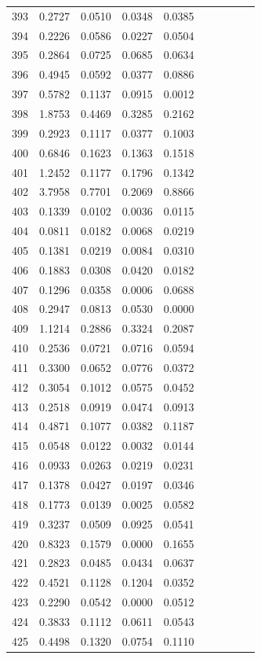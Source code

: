 \begin{table}
\begin{tabular}{cccccccccc}
393& 0.2727& 0.0510& 0.0348& 0.0385\\ 
394& 0.2226& 0.0586& 0.0227& 0.0504\\ 
395& 0.2864& 0.0725& 0.0685& 0.0634\\ 
396& 0.4945& 0.0592& 0.0377& 0.0886\\ 
397& 0.5782& 0.1137& 0.0915& 0.0012\\ 
398& 1.8753& 0.4469& 0.3285& 0.2162\\ 
399& 0.2923& 0.1117& 0.0377& 0.1003\\ 
400& 0.6846& 0.1623& 0.1363& 0.1518\\ 
401& 1.2452& 0.1177& 0.1796& 0.1342\\ 
402& 3.7958& 0.7701& 0.2069& 0.8866\\ 
403& 0.1339& 0.0102& 0.0036& 0.0115\\ 
404& 0.0811& 0.0182& 0.0068& 0.0219\\ 
405& 0.1381& 0.0219& 0.0084& 0.0310\\ 
406& 0.1883& 0.0308& 0.0420& 0.0182\\ 
407& 0.1296& 0.0358& 0.0006& 0.0688\\ 
408& 0.2947& 0.0813& 0.0530& 0.0000\\ 
409& 1.1214& 0.2886& 0.3324& 0.2087\\ 
410& 0.2536& 0.0721& 0.0716& 0.0594\\ 
411& 0.3300& 0.0652& 0.0776& 0.0372\\ 
412& 0.3054& 0.1012& 0.0575& 0.0452\\ 
413& 0.2518& 0.0919& 0.0474& 0.0913\\ 
414& 0.4871& 0.1077& 0.0382& 0.1187\\ 
415& 0.0548& 0.0122& 0.0032& 0.0144\\ 
416& 0.0933& 0.0263& 0.0219& 0.0231\\ 
417& 0.1378& 0.0427& 0.0197& 0.0346\\ 
418& 0.1773& 0.0139& 0.0025& 0.0582\\ 
419& 0.3237& 0.0509& 0.0925& 0.0541\\ 
420& 0.8323& 0.1579& 0.0000& 0.1655\\ 
421& 0.2823& 0.0485& 0.0434& 0.0637\\ 
422& 0.4521& 0.1128& 0.1204& 0.0352\\ 
423& 0.2290& 0.0542& 0.0000& 0.0512\\ 
424& 0.3833& 0.1112& 0.0611& 0.0543\\ 
425& 0.4498& 0.1320& 0.0754& 0.1110\\ 

\end{tabular}
\end{table}
